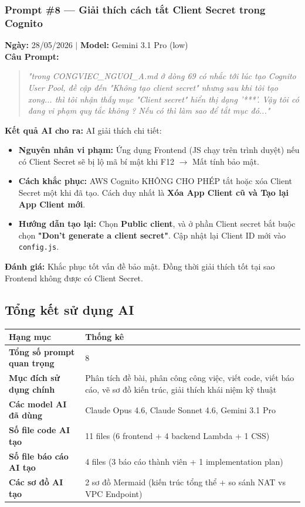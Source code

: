\documentclass[13pt]{article}
\begin{document}
\subsubsection{Prompt \#8 — Giải thích cách tắt Client Secret trong Cognito}
\textbf{Ngày:} 28/05/2026 $|$ \textbf{Model:} Gemini 3.1 Pro (low)\\
\textbf{Câu Prompt:}
\begin{quote}
\textit{"trong CONGVIEC\_NGUOI\_A.md ở dòng 69 có nhắc tới lúc tạo Cognito User Pool, đề cập đến "Không tạo client secret" nhưng sau khi tôi tạo xong... thì tôi nhận thấy mục "Client secret" hiển thị dạng '***'. Vậy tôi có đang vi phạm quy tắc không ? Nếu có thì làm sao để tắt mục đó..."}
\end{quote}
\textbf{Kết quả AI cho ra:}
AI giải thích chi tiết:
\begin{itemize}
    \item \textbf{Nguyên nhân vi phạm:} Ứng dụng Frontend (JS chạy trên trình duyệt) nếu có Client Secret sẽ bị lộ mã bí mật khi F12 $\rightarrow$ Mất tính bảo mật.
    \item \textbf{Cách khắc phục:} AWS Cognito KHÔNG CHO PHÉP tắt hoặc xóa Client Secret một khi đã tạo. Cách duy nhất là \textbf{Xóa App Client cũ và Tạo lại App Client mới}.
    \item \textbf{Hướng dẫn tạo lại:} Chọn \textbf{Public client}, và ở phần Client secret bắt buộc chọn \textbf{"Don't generate a client secret"}. Cập nhật lại Client ID mới vào \texttt{config.js}.
\end{itemize}
\textbf{Đánh giá:} Khắc phục tốt vấn đề bảo mật. Đồng thời giải thích tốt tại sao Frontend không được có Client Secret.

\subsection{Tổng kết sử dụng AI}
\begin{longtable}{|p{}|p{}|}
\hline
\textbf{Hạng mục} & \textbf{Thống kê} \\ \hline
\endhead
\textbf{Tổng số prompt quan trọng} & 8 \\ \hline
\textbf{Mục đích sử dụng chính} & Phân tích đề bài, phân công công việc, viết code, viết báo cáo, vẽ sơ đồ kiến trúc, giải thích khái niệm kỹ thuật \\ \hline
\textbf{Các model AI đã dùng} & Claude Opus 4.6, Claude Sonnet 4.6, Gemini 3.1 Pro \\ \hline
\textbf{Số file code AI tạo} & 11 files (6 frontend + 4 backend Lambda + 1 CSS) \\ \hline
\textbf{Số file báo cáo AI tạo} & 4 files (3 báo cáo thành viên + 1 implementation plan) \\ \hline
\textbf{Các sơ đồ AI tạo} & 2 sơ đồ Mermaid (kiến trúc tổng thể + so sánh NAT vs VPC Endpoint) \\ \hline
\end{longtable}
\end{document}
